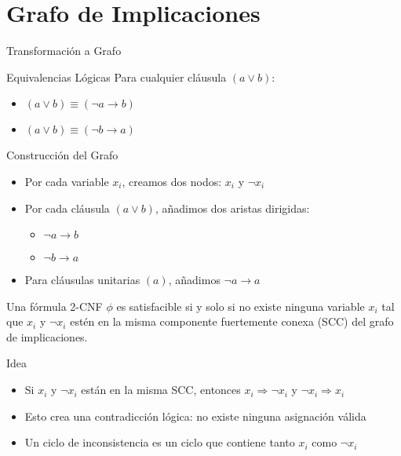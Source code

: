 \documentclass{beamer}
\begin{document}
\section{Grafo de Implicaciones}
\begin{frame}{Transformación a Grafo}
\begin{block}{Equivalencias Lógicas}
Para cualquier cláusula $(a \lor b)$:
\begin{itemize}
\item $(a \lor b) \equiv (\neg a \rightarrow b)$
\item $(a \lor b) \equiv (\neg b \rightarrow a)$
\end{itemize}
\end{block}

\begin{block}{Construcción del Grafo}
\begin{itemize}
\item Por cada variable $x_i$, creamos dos nodos: $x_i$ y $\neg x_i$
\item Por cada cláusula $(a \lor b)$, añadimos dos aristas dirigidas:
    \begin{itemize}
    \item $\neg a \rightarrow b$
    \item $\neg b \rightarrow a$
    \end{itemize}
\item Para cláusulas unitarias $(a)$, añadimos $\neg a \rightarrow a$
\end{itemize}
\end{block}
\end{frame}

\begin{frame}{}
\begin{theorem}
Una fórmula 2-CNF $\phi$ es satisfacible si y solo si no existe ninguna variable $x_i$ tal que $x_i$ y $\neg x_i$ estén en la misma componente fuertemente conexa (SCC) del grafo de implicaciones.
\end{theorem}

\begin{block}{Idea}
\begin{itemize}
\item Si $x_i$ y $\neg x_i$ están en la misma SCC, entonces $x_i \Rightarrow \neg x_i$ y $\neg x_i \Rightarrow x_i$
\item Esto crea una contradicción lógica: no existe ninguna asignación válida
\item Un \alert{ciclo de inconsistencia} es un ciclo que contiene tanto $x_i$ como $\neg x_i$
\end{itemize}
\end{block}
\end{frame}
\end{document}
